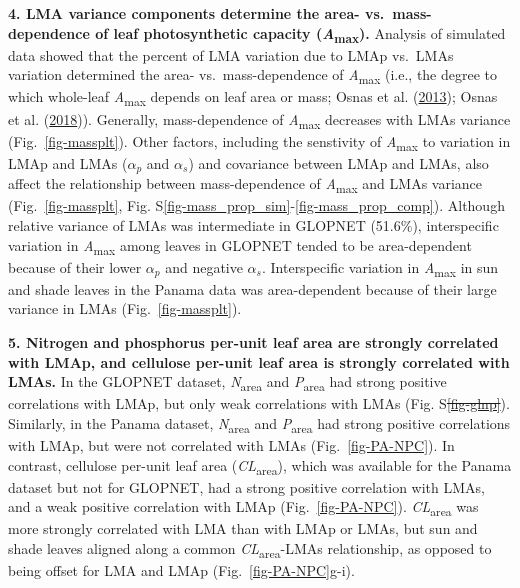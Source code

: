\documentclass[
  12pt,
  a4paper,
,tablecaptionabove
]{scrartcl}
\providecommand{\DIFaddtex}[1]{{\protect\color{blue}\uwave{#1}}} %
\providecommand{\DIFdeltex}[1]{{\protect\color{red}\sout{#1}}}                      %
\providecommand{\DIFaddbegin}{} %
\providecommand{\DIFaddend}{} %
\providecommand{\DIFdelbegin}{} %
\providecommand{\DIFdelend}{} %
\providecommand{\DIFadd}[1]{\texorpdfstring{\DIFaddtex{#1}}{#1}} %
\providecommand{\DIFdel}[1]{\texorpdfstring{\DIFdeltex{#1}}{}} %
\newcommand{\DIFscaledelfig}{0.5}
\newlength{\DIFdelgraphicswidth} %
\newlength{\DIFdelgraphicsheight} %
\newcommand{\DIFaddincludegraphics}[2][]{{\color{blue}\fbox{\DIFOincludegraphics[#1]{#2}}}} %
\newcommand{\DIFdelincludegraphics}[2][]{%
\sbox{\DIFdelgraphicsbox}{\DIFOincludegraphics[#1]{#2}}%
\settoboxwidth{\DIFdelgraphicswidth}{\DIFdelgraphicsbox} %
\settoboxtotalheight{\DIFdelgraphicsheight}{\DIFdelgraphicsbox} %
\scalebox{\DIFscaledelfig}{%
\parbox[b]{\DIFdelgraphicswidth}{\usebox{\DIFdelgraphicsbox}\\[-\baselineskip] \rule{\DIFdelgraphicswidth}{0em}}\llap{\resizebox{\DIFdelgraphicswidth}{\DIFdelgraphicsheight}{%
\setlength{\unitlength}{\DIFdelgraphicswidth}%
\begin{picture}(1,1)%
\thicklines\linethickness{2pt} %
{\color[rgb]{1,0,0}\put(0,0){\framebox(1,1){}}}%
{\color[rgb]{1,0,0}\put(0,0){\line( 1,1){1}}}%
{\color[rgb]{1,0,0}\put(0,1){\line(1,-1){1}}}%
\end{picture}%
}\hspace*{3pt}}} %
} %
\DeclareRobustCommand{\DIFaddbegin}{\DIFOaddbegin \let\includegraphics\DIFaddincludegraphics} %
\DeclareRobustCommand{\DIFaddend}{\DIFOaddend \let\includegraphics\DIFOincludegraphics} %
\DeclareRobustCommand{\DIFdelbegin}{\DIFOdelbegin \let\includegraphics\DIFdelincludegraphics} %
\DeclareRobustCommand{\DIFdelend}{\DIFOaddend \let\includegraphics\DIFOincludegraphics} %
\begin{document}
\textbf{4. LMA variance components determine the area-
vs.~mass-dependence of leaf photosynthetic capacity
(\emph{A}\textsubscript{max}).} Analysis of simulated data showed that
the percent of LMA variation due to LMAp vs.~LMAs variation determined
the area- vs.~mass-dependence of \emph{A}\textsubscript{max} (i.e., the
degree to which whole-leaf \emph{A}\textsubscript{max} depends on leaf
area or mass; Osnas et al. (\protect\hyperlink{ref-Osnas2013}{2013});
Osnas et al. (\protect\hyperlink{ref-Osnas2018}{2018})). Generally,
mass-dependence of \emph{A}\textsubscript{max} decreases with LMAs
variance (Fig.~\ref{fig-massplt}). Other factors, including the
senstivity of \emph{A}\textsubscript{max} to variation in LMAp and LMAs
(\(\alpha_p\) and \(\alpha_s\)) and covariance between LMAp and LMAs,
also affect the relationship between mass-dependence of
\emph{A}\textsubscript{max} and LMAs variance (Fig.~\ref{fig-massplt},
Fig. S\ref{fig-mass_prop_sim}-\ref{fig-mass_prop_comp}). Although
relative variance of LMAs was intermediate in GLOPNET (51.6\%),
interspecific variation in \emph{A}\textsubscript{max} among leaves in
GLOPNET tended to be area-dependent because of their lower \(\alpha_p\)
and negative \(\alpha_s\). Interspecific variation in
\emph{A}\textsubscript{max} in sun and shade leaves in the Panama data
was area-dependent because of their large variance in LMAs
(Fig.~\ref{fig-massplt}).

\textbf{5. Nitrogen and phosphorus per-unit leaf area are strongly
correlated with LMAp, and cellulose per-unit leaf area is strongly
correlated with LMAs.} In the GLOPNET dataset,
\emph{N}\textsubscript{area} and \emph{P}\textsubscript{area} had strong
positive correlations with LMAp, but only weak correlations with LMAs
(Fig. S\DIFdelbegin \DIFdel{\ref{fig-glnp}}\DIFdelend \DIFaddbegin \DIFadd{\ref{fig-gl_point_np2}}\DIFaddend ). Similarly, in the Panama dataset,
\emph{N}\textsubscript{area} and \emph{P}\textsubscript{area} had strong
positive correlations with LMAp, but were not correlated with LMAs
(Fig.~\ref{fig-PA-NPC}). In contrast, cellulose per-unit leaf area
(\emph{CL}\textsubscript{area}), which was available for the Panama
dataset but not for GLOPNET, had a strong positive correlation with
LMAs, and a weak positive correlation with LMAp (Fig.~\ref{fig-PA-NPC}).
\emph{CL}\textsubscript{area} was more strongly correlated with LMA than
with LMAp or LMAs, but sun and shade leaves aligned along a common
\emph{CL}\textsubscript{area}-LMAs relationship, as opposed to being
offset for LMA and LMAp (Fig.~\ref{fig-PA-NPC}g-i).
\end{document}
